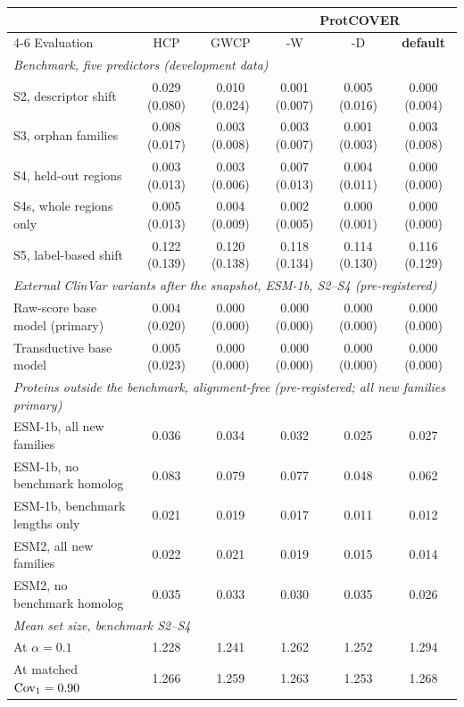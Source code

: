 \begin{tabular}{lccccc}
\toprule
 & & & \multicolumn{3}{c}{ProtCOVER} \\
\cmidrule(lr){4-6}
Evaluation & HCP & GWCP & -W & -D & \textbf{default} \\
\midrule
\multicolumn{6}{l}{\emph{Benchmark, five predictors (development data)}} \\
S2, descriptor shift & 0.029 (0.080) & 0.010 (0.024) & 0.001 (0.007) & 0.005 (0.016) & 0.000 (0.004) \\
S3, orphan families & 0.008 (0.017) & 0.003 (0.008) & 0.003 (0.007) & 0.001 (0.003) & 0.003 (0.008) \\
S4, held-out regions & 0.003 (0.013) & 0.003 (0.006) & 0.007 (0.013) & 0.004 (0.011) & 0.000 (0.000) \\
S4s, whole regions only & 0.005 (0.013) & 0.004 (0.009) & 0.002 (0.005) & 0.000 (0.001) & 0.000 (0.000) \\
S5, label-based shift & 0.122 (0.139) & 0.120 (0.138) & 0.118 (0.134) & 0.114 (0.130) & 0.116 (0.129) \\
\multicolumn{6}{l}{\emph{External ClinVar variants after the snapshot, ESM-1b, S2--S4 (pre-registered)}} \\
Raw-score base model (primary) & 0.004 (0.020) & 0.000 (0.000) & 0.000 (0.000) & 0.000 (0.000) & 0.000 (0.000) \\
Transductive base model & 0.005 (0.023) & 0.000 (0.000) & 0.000 (0.000) & 0.000 (0.000) & 0.000 (0.000) \\
\multicolumn{6}{l}{\emph{Proteins outside the benchmark, alignment-free (pre-registered; all new families primary)}} \\
ESM-1b, all new families & 0.036 & 0.034 & 0.032 & 0.025 & 0.027 \\
ESM-1b, no benchmark homolog & 0.083 & 0.079 & 0.077 & 0.048 & 0.062 \\
ESM-1b, benchmark lengths only & 0.021 & 0.019 & 0.017 & 0.011 & 0.012 \\
ESM2, all new families & 0.022 & 0.021 & 0.019 & 0.015 & 0.014 \\
ESM2, no benchmark homolog & 0.035 & 0.033 & 0.030 & 0.035 & 0.026 \\
\midrule
\multicolumn{6}{l}{\emph{Mean set size, benchmark S2--S4}} \\
At $\alpha=0.1$ & 1.228 & 1.241 & 1.262 & 1.252 & 1.294 \\
At matched $\mathrm{Cov}_1=0.90$ & 1.266 & 1.259 & 1.263 & 1.253 & 1.268 \\
\bottomrule
\end{tabular}

